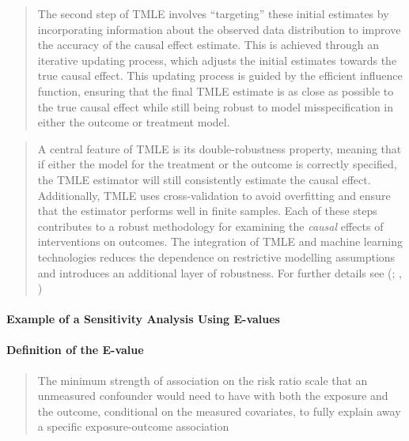 \documentclass[
  singlecolumn]{article}
\let\oldparagraph\paragraph
\renewcommand{\paragraph}[1]{\oldparagraph{#1}\mbox{}}
\begin{document}
\begin{quote}
The second step of TMLE involves ``targeting'' these initial estimates
by incorporating information about the observed data distribution to
improve the accuracy of the causal effect estimate. This is achieved
through an iterative updating process, which adjusts the initial
estimates towards the true causal effect. This updating process is
guided by the efficient influence function, ensuring that the final TMLE
estimate is as close as possible to the true causal effect while still
being robust to model misspecification in either the outcome or
treatment model.
\end{quote}

\begin{quote}
A central feature of TMLE is its double-robustness property, meaning
that if either the model for the treatment or the outcome is correctly
specified, the TMLE estimator will still consistently estimate the
causal effect. Additionally, TMLE uses cross-validation to avoid
overfitting and ensure that the estimator performs well in finite
samples. Each of these steps contributes to a robust methodology for
examining the \emph{causal} effects of interventions on outcomes. The
integration of TMLE and machine learning technologies reduces the
dependence on restrictive modelling assumptions and introduces an
additional layer of robustness. For further details see
(;
,
)
\end{quote}

\paragraph{Example of a Sensitivity Analysis Using
E-values}\label{example-of-a-sensitivity-analysis-using-e-values}

\paragraph{Definition of the E-value}\label{definition-of-the-e-value}

\begin{quote}
The minimum strength of association on the risk ratio scale that an
unmeasured confounder would need to have with both the exposure and the
outcome, conditional on the measured covariates, to fully explain away a
specific exposure-outcome association
\end{quote}
\end{document}
